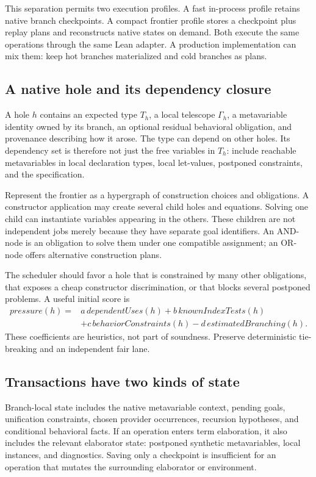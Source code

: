This separation permits two execution profiles. A fast in-process profile retains native branch checkpoints. A compact frontier profile stores a checkpoint plus replay plans and reconstructs native states on demand. Both execute the same operations through the same Lean adapter. A production implementation can mix them: keep hot branches materialized and cold branches as plans.

\subsection{A native hole and its dependency closure}
A hole $h$ contains an expected type $T_h$, a local telescope $\Gamma_h$, a metavariable identity owned by its branch, an optional residual behavioral obligation, and provenance describing how it arose. The type can depend on other holes. Its dependency set is therefore not just the free variables in $T_h$: include reachable metavariables in local declaration types, local let-values, postponed constraints, and the specification.

Represent the frontier as a hypergraph of construction choices and obligations. A constructor application may create several child holes and equations. Solving one child can instantiate variables appearing in the others. These children are not independent jobs merely because they have separate goal identifiers. An AND-node is an obligation to solve them under one compatible assignment; an OR-node offers alternative construction plans.

The scheduler should favor a hole that is constrained by many other obligations, that exposes a cheap constructor discrimination, or that blocks several postponed problems. A useful initial score is
\[
 \begin{aligned}
 \mathit{pressure}(h)={}&
 a\,\mathit{dependentUses}(h)+b\,\mathit{knownIndexTests}(h)\\
 &+c\,\mathit{behaviorConstraints}(h)-d\,\mathit{estimatedBranching}(h).
 \end{aligned}
\]
These coefficients are heuristics, not part of soundness. Preserve deterministic tie-breaking and an independent fair lane.

\subsection{Transactions have two kinds of state}
Branch-local state includes the native metavariable context, pending goals, unification constraints, chosen provider occurrences, recursion hypotheses, and conditional behavioral facts. If an operation enters term elaboration, it also includes the relevant elaborator state: postponed synthetic metavariables, local instances, and diagnostics. Saving only a \MetaM{} checkpoint is insufficient for an operation that mutates the surrounding elaborator or environment.

